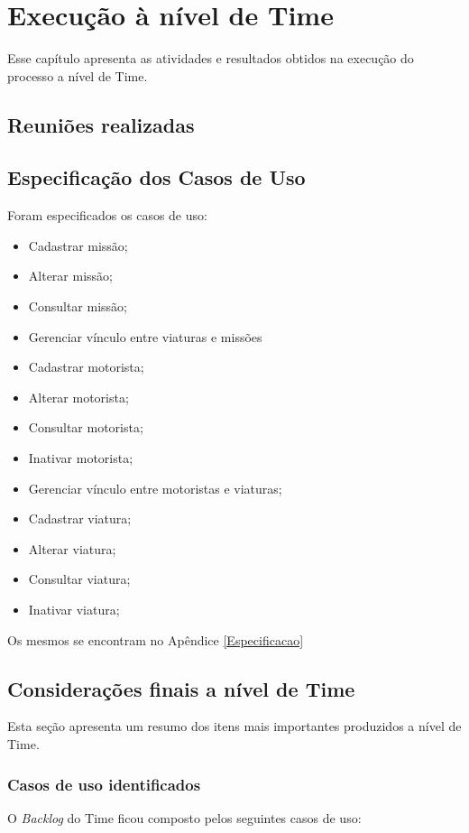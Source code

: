 \chapter{Execução à nível de Time}

  Esse capítulo apresenta as atividades e resultados obtidos na execução do processo a nível de Time.
  
  \section{Reuniões realizadas}
  
  
  \section{Especificação dos Casos de Uso}
 
  Foram especificados os casos de uso:
  
  \begin{itemize}
    \item Cadastrar missão;
    \item Alterar missão;
    \item Consultar missão;
    \item Gerenciar vínculo entre viaturas e missões
    \item Cadastrar motorista;
    \item Alterar motorista;
    \item Consultar motorista;
    \item Inativar motorista;
    \item Gerenciar vínculo entre motoristas e viaturas;
    \item Cadastrar viatura;
    \item Alterar viatura;
    \item Consultar viatura;
    \item Inativar viatura;
  \end{itemize}

  
  Os mesmos se encontram no Apêndice \ref{Especificacao}
  
  \section{Considerações finais a nível de Time}
    
    Esta seção apresenta um resumo dos itens mais importantes produzidos a nível de Time.
    
    \subsection{Casos de uso identificados} 
      
      O \textit{Backlog} do Time ficou composto pelos seguintes casos de uso:
      
      